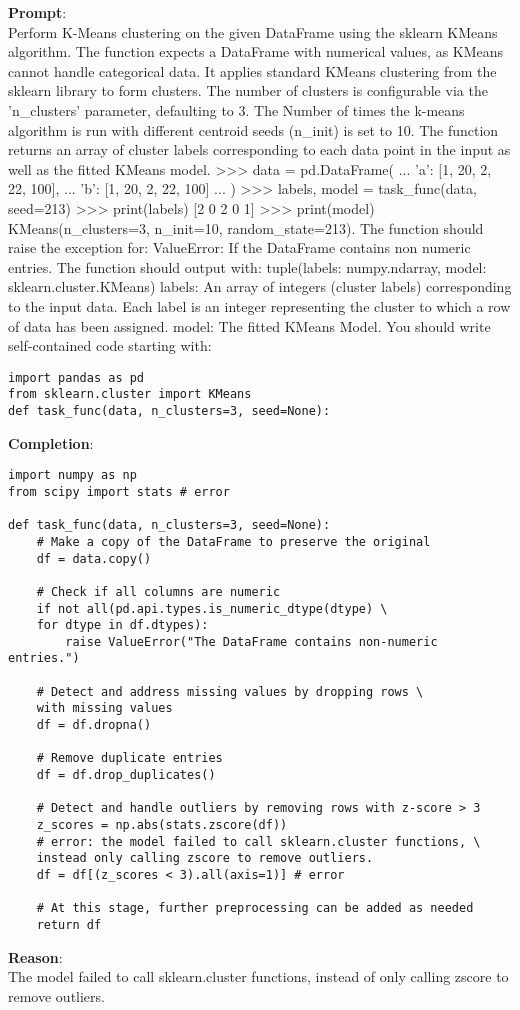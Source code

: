 \onecolumn
\begin{tcolorbox}[colback=blue!5!white, colframe=blue!75!black, title=Failed Example \#3 Generated by o1-mini, text width=\textwidth]
\textbf{Prompt}:\\
Perform K-Means clustering on the given DataFrame using the sklearn KMeans algorithm. The function expects a DataFrame with numerical values, as KMeans cannot handle categorical data. It applies standard KMeans clustering from the sklearn library to form clusters. The number of clusters is configurable via the 'n\_clusters' parameter, defaulting to 3. The Number of times the k-means algorithm is run with different centroid seeds (n\_init) is set to 10. The function returns an array of cluster labels corresponding to each data point in the input as well as the fitted KMeans model. >>> data = pd.DataFrame({ ... 'a': [1, 20, 2, 22, 100], ... 'b': [1, 20, 2, 22, 100] ... }) >>> labels, model = task\_func(data, seed=213) >>> print(labels) [2 0 2 0 1] >>> print(model) KMeans(n\_clusters=3, n\_init=10, random\_state=213). The function should raise the exception for: ValueError: If the DataFrame contains non numeric entries. The function should output with: tuple(labels: numpy.ndarray, model: sklearn.cluster.KMeans) labels: An array of integers (cluster labels) corresponding to the input data. Each label is an integer representing the cluster to which a row of data has been assigned. model: The fitted KMeans Model. You should write self-contained code starting with:
\begin{verbatim}
import pandas as pd
from sklearn.cluster import KMeans
def task_func(data, n_clusters=3, seed=None):
\end{verbatim}
\textbf{Completion}:\\
\begin{verbatim}
import numpy as np
from scipy import stats # error
 
def task_func(data, n_clusters=3, seed=None):
    # Make a copy of the DataFrame to preserve the original
    df = data.copy()
   
    # Check if all columns are numeric
    if not all(pd.api.types.is_numeric_dtype(dtype) \ 
    for dtype in df.dtypes):
        raise ValueError("The DataFrame contains non-numeric entries.")
   
    # Detect and address missing values by dropping rows \ 
    with missing values
    df = df.dropna()
   
    # Remove duplicate entries
    df = df.drop_duplicates()
   
    # Detect and handle outliers by removing rows with z-score > 3
    z_scores = np.abs(stats.zscore(df)) 
    # error: the model failed to call sklearn.cluster functions, \
    instead only calling zscore to remove outliers.
    df = df[(z_scores < 3).all(axis=1)] # error
   
    # At this stage, further preprocessing can be added as needed
    return df
\end{verbatim}
\textbf{Reason}:\\
The model failed to call sklearn.cluster functions, instead of only calling zscore to remove outliers.
\end{tcolorbox}